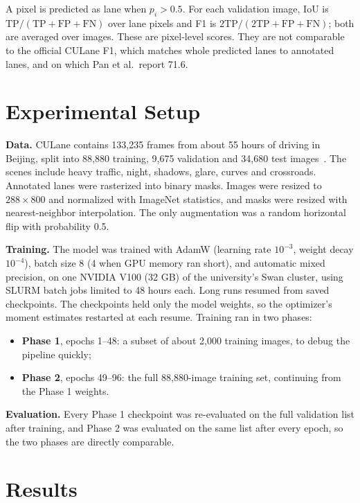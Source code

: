 \documentclass[11pt]{article}
\begin{document}
A pixel is predicted as lane when $p_i > 0.5$. For each validation image, IoU is
$\mathrm{TP}/(\mathrm{TP}+\mathrm{FP}+\mathrm{FN})$ over lane pixels and F1 is
$2\mathrm{TP}/(2\mathrm{TP}+\mathrm{FP}+\mathrm{FN})$; both are averaged over images. These are
pixel-level scores. They are not comparable to the official CULane F1, which matches whole predicted
lanes to annotated lanes, and on which Pan et al.\ report 71.6.

\section{Experimental Setup}

\textbf{Data.} CULane contains 133{,}235 frames from about 55 hours of driving in Beijing, split into
88{,}880 training, 9{,}675 validation and 34{,}680 test images~\cite{pan2018}. The scenes include
heavy traffic, night, shadows, glare, curves and crossroads. Annotated lanes were rasterized into
binary masks. Images were resized to $288\times800$ and normalized with ImageNet statistics, and masks
were resized with nearest-neighbor interpolation. The only augmentation was a random horizontal flip
with probability 0.5.

\textbf{Training.} The model was trained with AdamW (learning rate $10^{-3}$, weight decay $10^{-4}$),
batch size 8 (4 when GPU memory ran short), and automatic mixed precision, on one NVIDIA V100 (32 GB)
of the university's Swan cluster, using SLURM batch jobs limited to 48 hours each. Long runs resumed
from saved checkpoints. The checkpoints held only the model weights, so the optimizer's moment
estimates restarted at each resume. Training ran in two phases:
\begin{itemize}
  \item \textbf{Phase 1}, epochs 1--48: a subset of about 2{,}000 training images, to debug the
        pipeline quickly;
  \item \textbf{Phase 2}, epochs 49--96: the full 88{,}880-image training set, continuing from the
        Phase 1 weights.
\end{itemize}

\textbf{Evaluation.} Every Phase 1 checkpoint was re-evaluated on the full validation list after
training, and Phase 2 was evaluated on the same list after every epoch, so the two phases are
directly comparable.

\section{Results}
\end{document}
